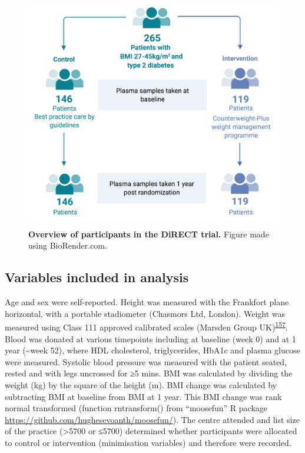 \documentclass[11pt,twoside]{bristolthesis}
\begin{document}
\begin{figure}
\includegraphics{figure/DiRECT/DiRECT_study_summary} \caption[Overview of participants in the DiRECT trial]{\textbf{Overview of participants in the DiRECT trial.} Figure made using BioRender.com.}\label{fig:direct-participants}
\end{figure}
\hypertarget{variables-included-in-analysis}{%
\subsection{Variables included in analysis}\label{variables-included-in-analysis}}

Age and sex were self-reported. Height was measured with the Frankfort plane horizontal, with a portable stadiometer (Chasmors Ltd, London). Weight was measured using Class 111 approved calibrated scales (Marsden Group UK)\textsuperscript{\protect\hyperlink{ref-Leslie2016}{157}}. Blood was donated at various timepoints including at baseline (week 0) and at 1 year (\textasciitilde week 52), where HDL cholesterol, triglycerides, HbA1c and plasma glucose were measured. Systolic blood pressure was measured with the patient seated, rested and with legs uncrossed for ≥5 mins. BMI was calculated by dividing the weight (kg) by the square of the height (m). BMI change was calculated by subtracting BMI at baseline from BMI at 1 year. This BMI change was rank normal transformed (function rntransform() from ``moosefun'' R package \url{https://github.com/hughesevoanth/moosefun/}). The centre attended and list size of the practice (\textgreater5700 or ≤5700) determined whether participants were allocated to control or intervention (minimisation variables) and therefore were recorded.
\end{document}
